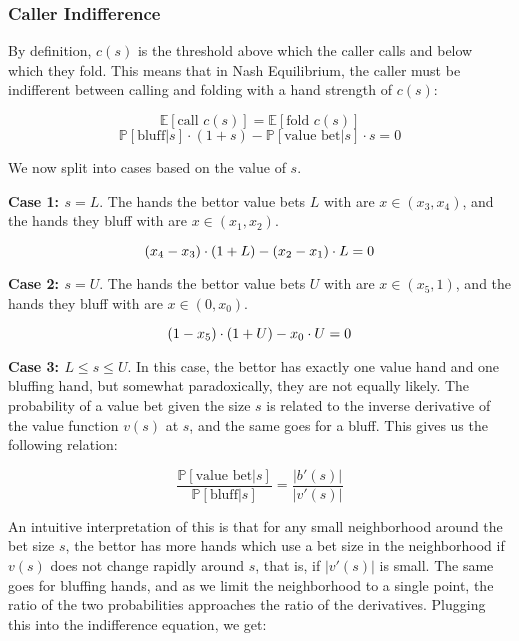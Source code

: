 \documentclass[../../main/main.tex]{subfiles}
\begin{document}
\subsubsection{Caller Indifference}
\label{subsec:caller_indifference}

By definition, $c(s)$ is the threshold above which the caller calls and below which they fold. This means that in Nash Equilibrium, the caller must be indifferent between calling and folding with a hand strength of $c(s)$:


  \[  \mathbb{E}[\text{call } c(s)] = \mathbb{E}[\text{fold } c(s)] \]
  \[  \mathbb{P}[\text{bluff} | s] \cdot (1+s) - \mathbb{P}[\text{value bet} | s]\cdot s = 0 \]


We now split into cases based on the value of $s$.

\textbf{Case 1: $s = L$}. The hands the bettor value bets $L$ with are $x \in (x_3, x_4)$, and the hands they bluff with are $x \in (x_1, x_2)$. 

\begin{equation}{\label{callindiffmin}}
    (x_4-x_3) \cdot (1+L) - (x_2-x_1) \cdot L = 0
\end{equation}

\textbf{Case 2: $s = U$}. The hands the bettor value bets $U$ with are $x \in (x_5, 1)$, and the hands they bluff with are $x \in (0, x_0)$. 

\begin{equation}{\label{callindiffmax}}
    (1-x_5) \cdot (1+U) - x_0 \cdot U = 0
\end{equation}

\textbf{Case 3: $L \leq s \leq U$}. In this case, the bettor has exactly one value hand and one bluffing hand, but somewhat paradoxically, they are not equally likely. The probability of a value bet given the size $s$ is related to the inverse derivative of the value function $v(s)$ at $s$, and the same goes for a bluff. This gives us the following relation:

\[ \frac{\mathbb{P}[\text{value bet} | s]}{\mathbb{P}[\text{bluff} | s]} = \frac{|b'(s)|}{|v'(s)|}\]

An intuitive interpretation of this is that for any small neighborhood around the bet size $s$, the bettor has more hands which use a bet size in the neighborhood if $v(s)$ does not change rapidly around $s$, that is, if $|v'(s)|$ is small. The same goes for bluffing hands, and as we limit the neighborhood to a single point, the ratio of the two probabilities approaches the ratio of the derivatives. Plugging this into the indifference equation, we get:
\end{document}
